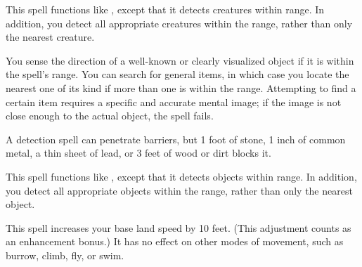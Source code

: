 \spellrng{\rngext}
\begin{spelleffect}
    This spell functions like , except that it detects creatures within \rngext range. In addition, you detect all appropriate creatures within the range, rather than only the nearest creature.
\end{spelleffect}

\spellrng{\rngmed}
\begin{spelleffect}
  You sense the direction of a well-known or clearly visualized object if it is within the spell's range. You can search for general items, in which case you locate the nearest one of its kind if more than one is within the range. Attempting to find a certain item requires a specific and accurate mental image; if the image is not close enough to the actual object, the spell fails.
\end{spelleffect}
\begin{spellnotes}
  A detection spell can penetrate barriers, but 1 foot of stone, 1 inch of common metal, a thin sheet of lead, or 3 feet of wood or dirt blocks it.
\end{spellnotes}

\spellrng{\rngext}
\begin{spelleffect}
    This spell functions like , except that it detects objects within \rngext range. In addition, you detect all appropriate objects within the range, rather than only the nearest object. 
\end{spelleffect}

\spellrng{\rngpers}
\begin{spelleffect}
  This spell increases your base land speed by 10 feet. (This adjustment counts as an enhancement bonus.) It has no effect on other modes of movement, such as burrow, climb, fly, or swim.
\end{spelleffect}

\begin{comment}
\subsubsection{M}
\end{comment}

